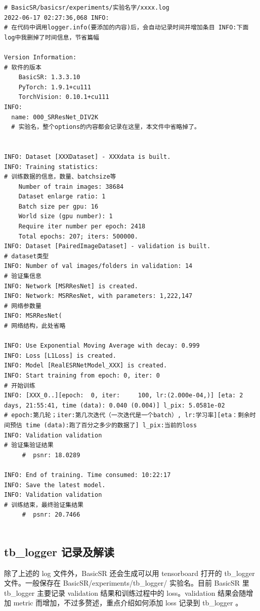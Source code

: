 \documentclass[../main.tex]{subfiles}
\begin{document}
\begin{verbatim}
# BasicSR/basicsr/experiments/实验名字/xxxx.log
2022-06-17 02:27:36,068 INFO: 
# 在代码中调用logger.info(要添加的内容)后，会自动记录时间并增加条目 INFO:下面log中我删掉了时间信息，节省篇幅

Version Information: 
# 软件的版本
	BasicSR: 1.3.3.10
	PyTorch: 1.9.1+cu111
	TorchVision: 0.10.1+cu111
INFO: 
  name: 000_SRResNet_DIV2K
  # 实验名，整个options的内容都会记录在这里，本文件中省略掉了。
  

INFO: Dataset [XXXDataset] - XXXdata is built.
INFO: Training statistics:
# 训练数据的信息，数量、batchsize等
	Number of train images: 38684
	Dataset enlarge ratio: 1
	Batch size per gpu: 16
	World size (gpu number): 1
	Require iter number per epoch: 2418
	Total epochs: 207; iters: 500000.
INFO: Dataset [PairedImageDataset] - validation is built.
# dataset类型
INFO: Number of val images/folders in validation: 14
# 验证集信息
INFO: Network [MSRResNet] is created.
INFO: Network: MSRResNet, with parameters: 1,222,147
# 网络参数量
INFO: MSRResNet(
# 网络结构，此处省略
  
INFO: Use Exponential Moving Average with decay: 0.999
INFO: Loss [L1Loss] is created.
INFO: Model [RealESRNetModel_XXX] is created.
INFO: Start training from epoch: 0, iter: 0
# 开始训练
INFO: [XXX_0..][epoch:  0, iter:     100, lr:(2.000e-04,)] [eta: 2 days, 21:55:41, time (data): 0.040 (0.004)] l_pix: 5.0581e-02 
# epoch:第几轮；iter:第几次迭代（一次迭代是一个batch）, lr:学习率][eta：剩余时间预估 time (data):跑了百分之多少的数据了] l_pix:当前的loss 
INFO: Validation validation
# 验证集验证结果
	 #  psnr: 18.0289
	 
INFO: End of training. Time consumed: 10:22:17
INFO: Save the latest model.
INFO: Validation validation
# 训练结束，最终验证集结果
	 #  psnr: 20.7466
	 
\end{verbatim}

\subsection{tb\_logger 记录及解读}

除了上述的 log 文件外，BasicSR 还会生成可以用 tensorboard 打开的 tb\_logger 文件。一般保存在 BasicSR/experiments/tb\_logger/ 实验名。目前 BasicSR 里 tb\_logger 主要记录 validation 结果和训练过程中的 loss。validation 结果会随增加 metric 而增加，不过多赘述，重点介绍如何添加 loss 记录到 tb\_logger 。
\end{document}
